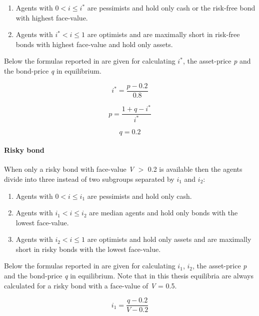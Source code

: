 \documentclass[../Bachelorarbeit.tex]{subfiles}
\begin{document}
\begin{enumerate}
\item Agents with $0 < i \leq i^*$ are pessimists and hold only cash or the risk-free bond with highest face-value.
\item Agents with $i^* < i \leq 1$ are optimists and are maximally short in risk-free bonds with highest face-value and hold only assets.
\end{enumerate}

Below the formulas reported in \cite{Breuer2015} are given for calculating $i^*$, the asset-price \textit{p} and the bond-price \textit{q} in equilibrium.

\begin{equation}
i^* = \frac{p - 0.2}{0.8}
\end{equation}

\begin{equation}
p = \frac{1 + q - i^*}{i^*}
\end{equation}

\begin{equation}
q = 0.2
\end{equation}

\paragraph{Risky bond}
When only a risky bond with face-value \textit{V} $>$ 0.2 is available then the agents divide into three instead of two subgroups separated by $i_{1}$ and $i_{2}$:

\begin{enumerate}
\item Agents with $0 < i \leq i_{1}$ are pessimists and hold only cash.
\item Agents with $i_{1} < i \leq i_{2}$ are median agents and hold only bonds with the lowest face-value.
\item Agents with $i_{2} < i \leq 1$ are optimists and hold only assets and are maximally short in risky bonds with the lowest face-value.
\end{enumerate} 

Below the formulas reported in \cite{Breuer2015} are given for calculating $i_{1}$, $i_{2}$, the asset-price \textit{p} and the bond-price \textit{q} in equilibrium. Note that in this thesis equilibria are always calculated for a risky bond with a face-value of \textit{V} = 0.5.

\begin{equation}
i_{1} = \frac{q - 0.2}{V - 0.2}
\end{equation}
\end{document}
